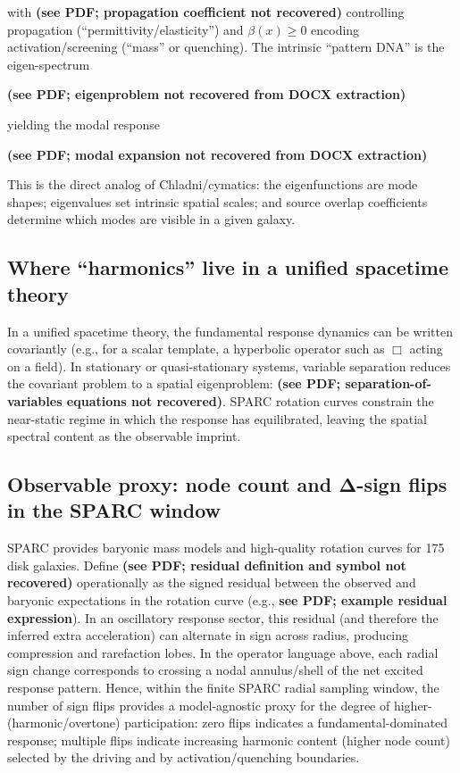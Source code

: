 with \textbf{(see PDF; propagation coefficient not recovered)} controlling propagation (``permittivity/elasticity'') and $\beta(x)\ge 0$ encoding activation/screening (``mass'' or quenching). The intrinsic ``pattern DNA'' is the eigen-spectrum

\textbf{(see PDF; eigenproblem not recovered from DOCX extraction)}

yielding the modal response

\textbf{(see PDF; modal expansion not recovered from DOCX extraction)}

This is the direct analog of Chladni/cymatics: the eigenfunctions are mode shapes; eigenvalues set intrinsic spatial scales; and source overlap coefficients determine which modes are visible in a given galaxy.

\subsection{Where “harmonics” live in a unified spacetime theory}

In a unified spacetime theory, the fundamental response dynamics can be written covariantly (e.g., for a scalar template, a hyperbolic operator such as $\Box$ acting on a field). In stationary or quasi-stationary systems, variable separation reduces the covariant problem to a spatial eigenproblem: \textbf{(see PDF; separation-of-variables equations not recovered)}. SPARC rotation curves constrain the near-static regime in which the response has equilibrated, leaving the spatial spectral content as the observable imprint.

\subsection{Observable proxy: node count and Δ-sign flips in the SPARC window}

SPARC provides baryonic mass models and high-quality rotation curves for 175 disk galaxies. Define \textbf{(see PDF; residual definition and symbol not recovered)} operationally as the signed residual between the observed and baryonic expectations in the rotation curve (e.g., \textbf{see PDF; example residual expression}). In an oscillatory response sector, this residual (and therefore the inferred extra acceleration) can alternate in sign across radius, producing compression and rarefaction lobes. In the operator language above, each radial sign change corresponds to crossing a nodal annulus/shell of the net excited response pattern. Hence, within the finite SPARC radial sampling window, the number of sign flips provides a model-agnostic proxy for the degree of higher-(harmonic/overtone) participation: zero flips indicates a fundamental-dominated response; multiple flips indicate increasing harmonic content (higher node count) selected by the driving and by activation/quenching boundaries.

